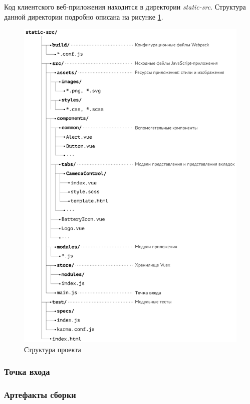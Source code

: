 Код клиентского веб-приложения находится в директории \emph{static-src}. Структура данной директории подробно описана на рисунке \ref{fig:project-tree}.

\begin{figure}[h!]
  \centering
  \setlength{\fboxsep}{5pt}
  \includegraphics[width=.95\textwidth]{img/tikz/project-tree/pic}
  \vspace*{6pt}
  \caption{Структура проекта}\label{fig:project-tree}
\end{figure}


\subsubsection{Точка входа}


\subsubsection{Артефакты сборки}



